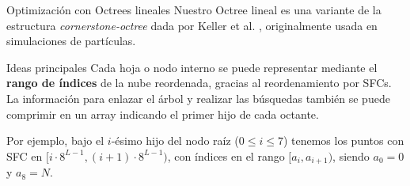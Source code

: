 \documentclass[aspectratio=169]{beamer}
\begin{document}
\begin{frame}{Optimización con Octrees lineales}
        Nuestro Octree lineal es una variante de la estructura \textit{cornerstone-octree} dada por Keller et al. \cite{Keller2023}, originalmente usada en simulaciones de partículas.
        \vspace{1em}
        \begin{block}{Ideas principales}
            \textrightarrow \: Cada hoja o nodo interno se puede representar mediante el \textbf{rango de índices} de la nube reordenada, gracias al reordenamiento por SFCs. \\
            \textrightarrow \: La información para enlazar el árbol y realizar las búsquedas también se puede comprimir en un array indicando el primer hijo de cada octante.
        \end{block} 

        \textbullet\: Por ejemplo, bajo el $i$-ésimo hijo del nodo raíz ($0 \leq i \leq 7$) tenemos los puntos con SFC en $[i\cdot 8^{L-1}, (i+1) \cdot 8^{L-1})$, con índices en el rango $[a_i, a_{i+1})$, siendo $a_0 = 0$ y $a_8 = N$.
\end{frame}
\end{document}
